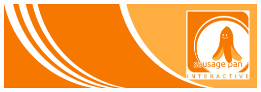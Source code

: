 \documentclass[10pt,a4paper,notitlepage]{report}
\author{Sausage Pan}
\begin{document}
	\newcommand{\Eins}[1]{\color{orange}\textbf{{\Large#1}}} %
	\newcommand{\Zwei}[1]{\color{orange}\textbf{{\large#1}}} %
	\newcommand{\Drei}[1]{\color{orange}{\normalsize#1}} %
	\newcommand{\Text}{\color{schwarz}} %
	\newcommand{\Fusszeile}
	{\textit{{\footnotesize Eckert, Georg - Roscher, Philipp - Krien, Alexandra - Sinakow, Sergej - Blasberg, Bettina - Groß, Stephanie Sara}}} %
	\marginpar{\vspace{3.0mm} \color{orange}\rule{0.8mm}{53.3mm} \\[3mm] \color{hellorange}\rule{0.8mm}{170mm}}
	\begin{center}
		\includegraphics[width=160mm]{header2}
	\end{center}
\end{document}
